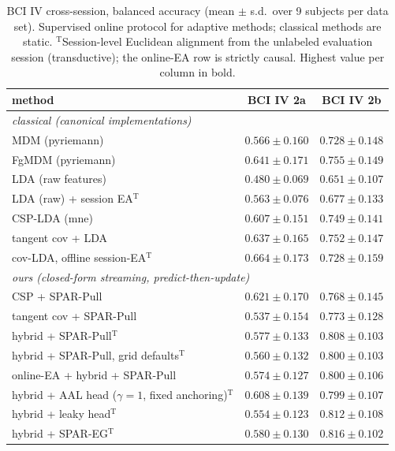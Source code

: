 \documentclass[11pt]{article}
\begin{document}
\begin{table}[h]
\centering
\scriptsize
\setlength{\tabcolsep}{2.5pt}
\renewcommand{\arraystretch}{0.86}
\caption{BCI IV cross-session, balanced accuracy (mean $\pm$ s.d.\ over 9 subjects per data set).
Supervised online protocol for adaptive methods; classical methods are static. $^{\mathrm{T}}$Session-level Euclidean alignment from the unlabeled evaluation session (transductive); the online-EA row is strictly causal.
Highest value per column in bold.}
\label{tab:eeg}
\begin{tabular}{lcc}
\toprule
method & BCI IV 2a & BCI IV 2b \\
\midrule
\multicolumn{3}{l}{\emph{classical (canonical implementations)}}\\
MDM (pyriemann) & $0.566 \pm 0.160$ & $0.728 \pm 0.148$ \\
FgMDM (pyriemann) & $0.641 \pm 0.171$ & $0.755 \pm 0.149$ \\
LDA (raw features) & $0.480 \pm 0.069$ & $0.651 \pm 0.107$ \\
LDA (raw) + session EA$^{\mathrm{T}}$ & $0.563 \pm 0.076$ & $0.677 \pm 0.133$ \\
CSP-LDA (mne) & $0.607 \pm 0.151$ & $0.749 \pm 0.141$ \\
tangent cov + LDA & $0.637 \pm 0.165$ & $0.752 \pm 0.147$ \\
cov-LDA, offline session-EA$^{\mathrm{T}}$ & $0.664 \pm 0.173$ & $0.728 \pm 0.159$ \\
\midrule
\multicolumn{3}{l}{\emph{ours (closed-form streaming, predict-then-update)}}\\
CSP + SPAR-Pull & $0.621 \pm 0.170$ & $0.768 \pm 0.145$ \\
tangent cov + SPAR-Pull & $0.537 \pm 0.154$ & $0.773 \pm 0.128$ \\
hybrid + SPAR-Pull$^{\mathrm{T}}$ & $0.577 \pm 0.133$ & $0.808 \pm 0.103$ \\
hybrid + SPAR-Pull, grid defaults$^{\mathrm{T}}$ & $0.560 \pm 0.132$ & $0.800 \pm 0.103$ \\
online-EA + hybrid + SPAR-Pull & $0.574 \pm 0.127$ & $0.800 \pm 0.106$ \\
hybrid + AAL head ($\gamma{=}1$, fixed anchoring)$^{\mathrm{T}}$ & $0.608 \pm 0.139$ & $0.799 \pm 0.107$ \\
hybrid + leaky head$^{\mathrm{T}}$ & $0.554 \pm 0.123$ & $0.812 \pm 0.108$ \\
hybrid + SPAR-EG$^{\mathrm{T}}$ & $0.580 \pm 0.130$ & $\mathbf{0.816 \pm 0.102}$ \\

\end{tabular}
\end{table}
\end{document}
